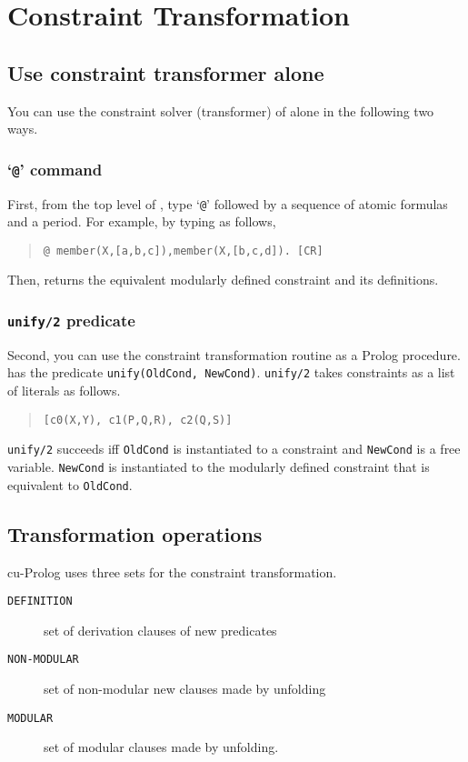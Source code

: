 \section{Constraint Transformation}

\subsection{Use constraint transformer alone}
You can use the constraint solver (transformer) of \cuprolog alone 
in the following two ways.

\subsubsection{`{\tt @}' command}
First, from the top level of \cuprolog, type `{\tt @}' followed by a sequence 
of atomic formulas and a period. 
For example, by typing as follows,
\begin{quote}
	{\tt @ member(X,[a,b,c]),member(X,[b,c,d]). [CR]}
\end{quote}
Then, \cuprolog returns the equivalent modularly defined constraint 
and its definitions.

\subsubsection{{\tt unify/2} predicate}
Second, you can use the constraint transformation routine as a Prolog
procedure. 
\cuprolog has the predicate {\tt unify(OldCond, NewCond)}. 
{\tt unify/2} takes constraints as a list of literals as follows.
\begin{quote}
	{\tt [c0(X,Y), c1(P,Q,R), c2(Q,S)] }
\end{quote}
{\tt unify/2} succeeds iff {\tt OldCond} is instantiated 
to a constraint and {\tt NewCond} is a free variable. 
{\tt NewCond} is instantiated to the modularly defined constraint that 
is equivalent to {\tt OldCond}.

\subsection{Transformation operations}
cu-Prolog uses three sets for the constraint transformation. 
\begin{description}
\item [{\tt DEFINITION}] set of derivation clauses of new predicates 
\item [{\tt NON-MODULAR}] set of non-modular new clauses made by unfolding
\item [{\tt MODULAR}] set of modular clauses made by unfolding.
\end{description}

